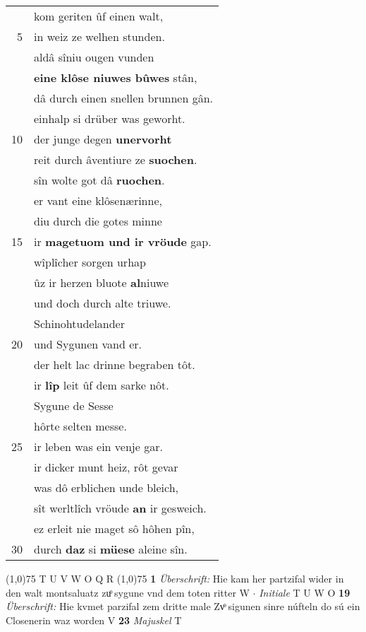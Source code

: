 \documentclass[8pt,a4paper,notitlepage]{article}
\begin{document}
\begin{table}[ht]
\begin{minipage}[t]{0.5\linewidth}
\begin{tabular}{rl}
 & kom geriten ûf einen walt,\\ 
5 & in weiz ze welhen stunden.\\ 
 & aldâ sîniu ougen vunden\\ 
 & \textbf{eine klôse niuwes bûwes} stân,\\ 
 & dâ durch einen snellen brunnen gân.\\ 
 & einhalp si drüber was geworht.\\ 
10 & der junge degen \textbf{unervorht}\\ 
 & reit durch âventiure ze \textbf{suochen}.\\ 
 & sîn wolte got dâ \textbf{ruochen}.\\ 
 & er vant eine klôsenærinne,\\ 
 & diu durch die gotes minne\\ 
15 & ir \textbf{magetuom und ir vröude} gap.\\ 
 & wîplîcher sorgen urhap\\ 
 & ûz ir herzen bluote \textbf{al}niuwe\\ 
 & und doch durch alte triuwe.\\ 
 & Schinohtudelander\\ 
20 & und Sygunen vand er.\\ 
 & der helt lac drinne begraben tôt.\\ 
 & ir \textbf{lîp} leit ûf dem sarke nôt.\\ 
 & Sygune de Sesse\\ 
 & hôrte selten messe.\\ 
25 & ir leben was ein venje gar.\\ 
 & ir dicker munt heiz, rôt gevar\\ 
 & was dô erblichen unde bleich,\\ 
 & sît werltlîch vröude \textbf{an} ir gesweich.\\ 
 & ez erleit nie maget sô hôhen pîn,\\ 
30 & durch \textbf{daz} si \textbf{müese} aleine sîn.\\ 
\end{tabular}
\scriptsize
\line(1,0){75} \newline
T U V W O Q R \newline
\line(1,0){75} \newline
\textbf{1} \textit{Überschrift:} Hie kam her partzifal wider in den walt montsaluatz zuͦ sygune vnd dem toten ritter W   $\cdot$ \textit{Initiale} T U W O  \textbf{19} \textit{Überschrift:} Hie kvmet parzifal zem dritte male Zvͦ sigunen sinre núfteln do sú ein Closenerin waz worden V  \textbf{23} \textit{Majuskel} T  \newline

\end{minipage}
\end{table}
\end{document}
